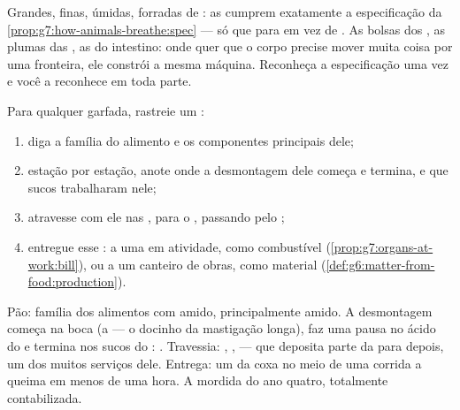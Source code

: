 \begin{example}\label{ex:g7:digestion-and-nutrients:spec}
Grandes, finas, úmidas, forradas de : as  cumprem
exatamente a especificação da
\cref{prop:g7:how-animals-breathe:spec} --- só que para  em
vez de . As bolsas dos , as plumas das , as
 do intestino: onde quer que o corpo precise mover muita
coisa por uma fronteira, ele constrói a mesma máquina. Reconheça a
especificação uma vez e você a reconhece em toda parte.
\end{example}

\begin{method}\label{met:g7:digestion-and-nutrients:trace}
Para qualquer garfada, rastreie um :
\begin{enumerate}
  \item diga a família do alimento e os componentes principais dele;
  \item estação por estação, anote onde a desmontagem dele começa e
        termina, e que sucos trabalharam nele;
  \item atravesse com ele nas , para o , passando
        pelo ;
  \item entregue esse : a uma  em atividade, como
        combustível (\cref{prop:g7:organs-at-work:bill}), ou a um
        canteiro de obras, como material
        (\cref{def:g6:matter-from-food:production}).
\end{enumerate}
\end{method}

\begin{example}\label{ex:g7:digestion-and-nutrients:breadtrace}
Pão: família dos alimentos com amido, principalmente amido. A
desmontagem começa na boca (a  --- o docinho da mastigação
longa), faz uma pausa no ácido do  e termina nos sucos do
: . Travessia: , ,  ---
que deposita parte da  para depois, um dos muitos serviços
dele. Entrega: um  da coxa no meio de uma corrida a queima em
menos de uma hora. A mordida do ano quatro, totalmente contabilizada.
\end{example}

